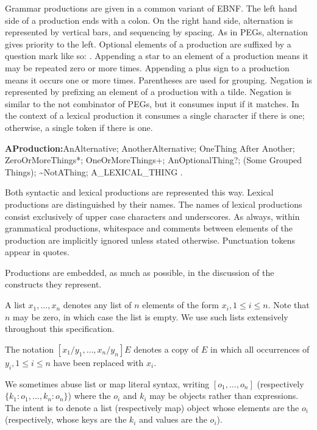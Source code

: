 \documentclass{article}
\begin{document}
\LMHash{}
Grammar productions are given in a common variant of EBNF.
The left hand side of a production ends with a colon.
On the right hand side, alternation is represented by vertical bars, and sequencing by spacing.
As in PEGs, alternation gives priority to the left.
Optional elements of a production are suffixed by a question mark like so: .
Appending a star to an element of a production means it may be repeated zero or more times.
Appending a plus sign to a production means it occurs one or more times.
Parentheses are used for grouping.
Negation is represented by prefixing an element of a production with a tilde.
Negation is similar to the not combinator of PEGs, but it consumes input if it matches.
In the context of a lexical production it consumes a single character if there is one; otherwise, a single token if there is one.


\begin{grammar}
{\sf
{\bf AProduction:}AnAlternative;
  AnotherAlternative;
  OneThing After Another;
  ZeroOrMoreThings*;
  OneOrMoreThings+;
  AnOptionalThing?;
  (Some Grouped Things);
  \~{}NotAThing;
  A\_LEXICAL\_THING
  .
}
\end{grammar}

\LMHash{}
Both syntactic and lexical productions are represented this way.
Lexical productions are distinguished by their names.
The names of lexical productions consist exclusively of upper case characters and underscores.
As always, within grammatical productions, whitespace and comments between elements of the production are implicitly ignored unless stated otherwise.
Punctuation tokens appear in quotes.

\LMHash{}
Productions are embedded, as much as possible, in the discussion of the constructs they represent.

\LMHash{}
A list $x_1, \ldots, x_n$ denotes any list of $n$ elements of the form $x_i, 1 \le i \le n$.
Note that $n$ may be zero, in which case the list is empty.
We use such lists extensively throughout this specification.

\LMHash{}
The notation $[x_1/y_1, \ldots, x_n/y_n]E$ denotes a copy of $E$ in which all occurrences of $y_i, 1 \le i \le n$ have been replaced with $x_i$.

\LMHash{}
We sometimes abuse list or map literal syntax, writing $[o_1, \ldots, o_n]$ (respectively $\{k_1: o_1, \ldots, k_n: o_n\}$) where the $o_i$ and $k_i$ may be objects rather than expressions.
The intent is to denote a list (respectively map) object whose elements are the $o_i$ (respectively, whose keys are the $k_i$ and values are the $o_i$).
\end{document}
